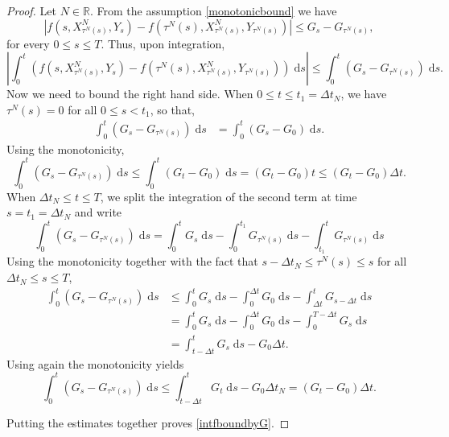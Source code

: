 \documentclass[reqno,12pt]{amsart}
\theoremstyle{plain}%
\theoremstyle{definition}
\begin{document}
\begin{proof}
    Let $N\in \mathbb{R}$. From the assumption \eqref{monotonicbound} we have
    \[
        |f(s, X_{\tau^N(s)}^N, Y_s) - f(\tau^N(s), X_{\tau^N(s)}^N, Y_{\tau^N(s)})| \leq G_s - G_{\tau^N(s)},
    \]
    for every $0\leq s \leq T$. Thus, upon integration,
    \[
        \left|\int_0^t \left( f(s, X_{\tau^N(s)}^N, Y_s) - f(\tau^N(s), X_{\tau^N(s)}^N, Y_{\tau^N(s)}) \right)\;\mathrm{d}s\right| \leq \int_0^t (G_s - G_{\tau^N(s)})\;\mathrm{d}s.
    \]
    Now we need to bound the right hand side. When $0 \leq t\leq t_1 = \Delta t_N$, we have $\tau^N(s) = 0$ for all $0 \leq s < t_1$, so that,
    \begin{align*}
      \int_0^t (G_s - G_{\tau^N(s)})\;\mathrm{d}s & = \int_0^t (G_s - G_0) \;\mathrm{d}s.
    \end{align*}
    Using the monotonicity,
    \[
      \int_0^t (G_s - G_{\tau^N(s)})\;\mathrm{d}s \leq \int_0^t (G_t - G_0) \;\mathrm{d}s  = (G_t - G_0)t \leq (G_t - G_0)\Delta t.
    \]
    When $\Delta t_N\leq t \leq T$, we split the integration of the second term at time $s = t_1 = \Delta t_N$ and write
    \[ 
      \int_0^t (G_s - G_{\tau^N(s)})\;\mathrm{d}s = \int_0^t G_s \;\mathrm{d}s - \int_0^{t_1} G_{\tau^N(s)}\;\mathrm{d}s - \int_{t_1}^t G_{\tau^N(s)}\;\mathrm{d}s
    \]
    Using the monotonicity together with the fact that $s - \Delta t_N\leq \tau^N(s) \leq s$ for all $\Delta t_N\leq s \leq T$,
    \begin{align*}
        \int_0^t (G_s - G_{\tau^N(s)})\;\mathrm{d}s & \leq \int_0^t G_s \;\mathrm{d}s - \int_0^{\Delta t} G_0\;\mathrm{d}s - \int_{\Delta t}^t G_{s-\Delta t}\;\mathrm{d}s \\
        & = \int_0^t G_s \;\mathrm{d}s - \int_0^{\Delta t} G_0\;\mathrm{d}s - \int_{0}^{T-\Delta t} G_s\;\mathrm{d}s \\
        & = \int_{t-\Delta t}^t G_s \;\mathrm{d}s - G_0\Delta t.
    \end{align*}
    Using again the monotonicity yields
    \[ 
      \int_0^t (G_s - G_{\tau^N(s)})\;\mathrm{d}s \leq \int_{t-\Delta t}^t G_t \;\mathrm{d}s - G_0\Delta t_N= (G_t - G_0)\Delta t.
    \]

    Putting the estimates together proves \eqref{intfboundbyG}.
\end{proof}
\end{document}
